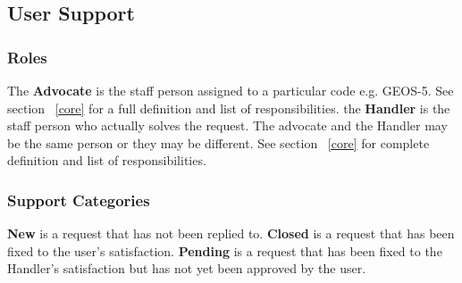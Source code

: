\subsection{User Support}
\label{sec:usr_support}


\subsubsection{Roles}
The {\bf Advocate} is the staff person assigned to a particular code e.g. GEOS-5. See section ~\ref{core} for a full definition and list of responsibilities. 
the {\bf Handler} is the staff person who actually solves the request. The advocate and the Handler may be the same person or they may be different. See section ~\ref{core} for complete definition and list of responsibilities.

\subsubsection{Support Categories}
{\bf New} is a request that has not been replied to.
{\bf Closed} is a request that has been fixed to the user's satisfaction.
{\bf Pending} is a request that has been fixed to the Handler's satisfaction but has not yet been approved by the user.


